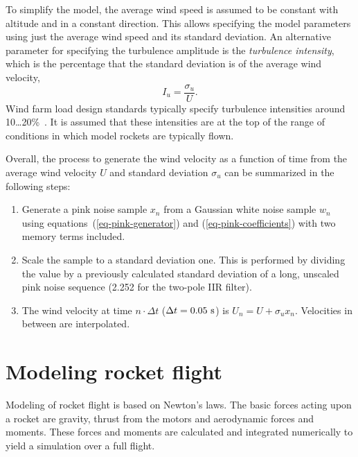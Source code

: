 To simplify the model, the average wind speed is assumed to be
constant with altitude and in a constant direction.  This allows
specifying the model parameters using just the average wind speed and
its standard deviation.  An alternative parameter for specifying the
turbulence amplitude is the {\it turbulence intensity}, which is the
percentage that the standard deviation is of the average wind
velocity,
%
\begin{equation}
I_u = \frac{\sigma_u}{U}.
\end{equation}
%
Wind farm load design standards typically specify turbulence
intensities around 10\ldots20\%~\cite[p.~22]{wind-energy-handbook}.
It is assumed that these intensities are at the top of the range of
conditions in which model rockets are typically flown.

Overall, the process to generate the wind velocity as a function of
time from the average wind velocity $U$ and standard deviation
$\sigma_u$ can be summarized in the following steps:
%
\begin{enumerate}
%
\item Generate a pink noise sample $x_n$ from a Gaussian white noise
  sample $w_n$ using equations~(\ref{eq-pink-generator}) and
  (\ref{eq-pink-coefficients}) with two memory terms included.

\item Scale the sample to a standard deviation one.  This is performed
  by dividing the value by a previously calculated standard deviation
  of a long, unscaled pink noise sequence (2.252 for the two-pole IIR
  filter).

\item The wind velocity at time $n\cdot\Delta t$ ($\Delta t = 0.05\rm~s$)
  is $U_n = U + \sigma_u x_n$.  Velocities in between are interpolated.
\end{enumerate}




\section{Modeling rocket flight}
\label{sec-flight-modeling}


Modeling of rocket flight is based on Newton's laws.  The basic forces
acting upon a rocket are gravity, thrust from the motors and
aerodynamic forces and moments.  These forces and moments are
calculated and integrated numerically to yield a simulation over a
full flight.

